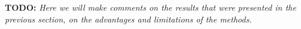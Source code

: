 \textbf{TODO: }
\textit{Here we will make comments on the results that were presented in the previous section, on the advantages and limitations of the methods.}
